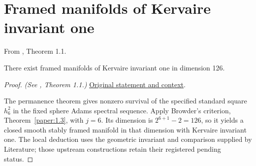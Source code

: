 \section{Framed manifolds of Kervaire invariant one}
\begin{theorem}
\label{paper:1.1}
From \cite{LWX126}, Theorem 1.1.\par
\label{thm:main}
    There exist framed manifolds of Kervaire invariant one in dimension 126.


\end{theorem}
\begin{proof}
\textit{(See \cite{LWX126}, Theorem 1.1.)} \href{paper/main.tex.html#L102}{Original statement and context}.

The permanence theorem gives nonzero survival of the specified standard square $h_6^2$ in the fixed sphere Adams spectral sequence. Apply Browder's criterion, Theorem~\ref{paper:1.3}, with $j=6$. Its dimension is $2^{6+1}-2=126$, so it yields a closed smooth stably framed manifold in that dimension with Kervaire invariant one. The local deduction uses the geometric invariant and comparison supplied by Literature; those upstream constructions retain their registered pending status.
\end{proof}


